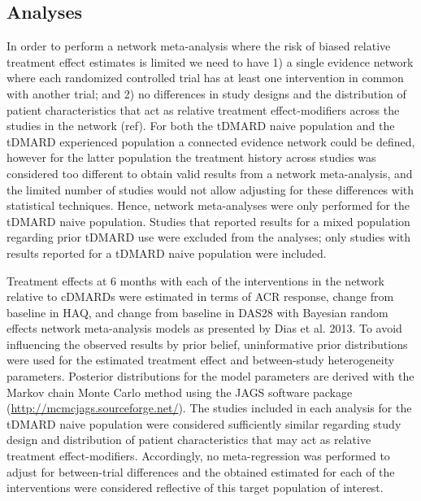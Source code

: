 \documentclass[11pt,final,fleqn]{article}\usepackage[]{graphicx}\usepackage[]{color}
\theoremstyle{plain}
\begin{document}
\begin{appendices}
\subsection{Analyses}\label{app:nma-analyses}
In order to perform a network meta-analysis where the risk of biased relative treatment effect estimates is limited we need to have 1) a single evidence network where each randomized controlled trial has at least one intervention in common with another trial; and 2) no differences in study designs and the distribution of patient characteristics that act as relative treatment effect-modifiers across the studies in the network (ref). For both the tDMARD naive population and the tDMARD experienced population a connected evidence network could be defined, however for the latter population the treatment history across studies was considered too different to obtain valid results from a network meta-analysis, and the limited number of studies would not allow adjusting for these differences with statistical techniques. Hence, network meta-analyses were only performed for the tDMARD naive population. Studies that reported results for a mixed population regarding prior tDMARD use were excluded from the analyses; only studies with results reported for a tDMARD naive population were included. 

Treatment effects at 6 months with each of the interventions in the network relative to cDMARDs were estimated in terms of ACR response, change from baseline in HAQ, and change from baseline in DAS28 with Bayesian random effects network meta-analysis models as presented by Dias et al. 2013. To avoid influencing the observed results by prior belief, uninformative prior distributions were used for the estimated treatment effect and between-study heterogeneity parameters. Posterior distributions for the model parameters are derived with the Markov chain Monte Carlo method using the JAGS software package (\url{http://mcmcjags.sourceforge.net/}). The studies included in each analysis for the tDMARD naive population were considered sufficiently similar regarding study design and distribution of patient characteristics that may act as relative treatment effect-modifiers. Accordingly, no meta-regression was performed to adjust for between-trial differences and the obtained estimated for each of the interventions were considered reflective of this target population of interest. 


\end{appendices}
\end{document}
